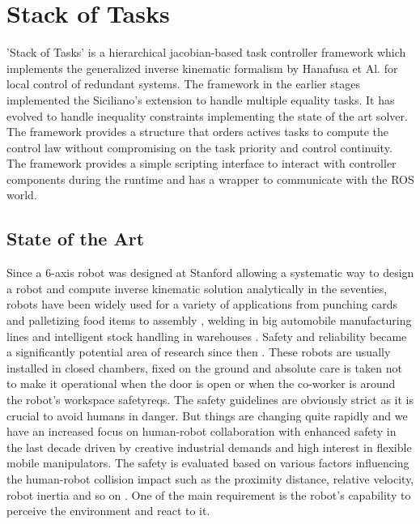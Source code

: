 \section{Stack of Tasks}

'Stack of Tasks' is a hierarchical jacobian-based task controller framework which implements the generalized inverse kinematic formalism by Hanafusa et Al. for local control of redundant systems\cite{hanafusa1981analysis}\cite{Mansard2009ik}. The framework in the earlier stages implemented the Siciliano's extension to handle multiple equality tasks\cite{siciliano1991general}. It has evolved to handle inequality constraints implementing the state of the art solver. The framework provides a structure that orders actives tasks to compute the control law without compromising on the task priority and control continuity. The framework provides a simple scripting interface to interact with controller components during the runtime and has a wrapper to communicate with the ROS world.
\subsection{State of the Art}
Since a 6-axis robot was designed at Stanford allowing a systematic way to design a robot and compute inverse kinematic solution analytically in the seventies, robots have been widely used for a variety of applications from punching cards and palletizing food items to assembly , welding in big automobile manufacturing lines and intelligent stock handling in warehouses \cite{scheinman1969design}. Safety and reliability became a significantly potential area of research since then \cite{dhillon2012robot}. These robots are usually installed in closed chambers, fixed on the ground and absolute care is taken not to make it operational when the door is open or when the co-worker is around the robot’s workspace {safetyreqs}. The safety guidelines are obviously strict as it is crucial to avoid humans in danger. But things are changing quite rapidly and we have an increased focus on human-robot collaboration with enhanced safety in the last decade \cite{Bicchi2008,dhillon2012robot} driven by creative industrial demands and high interest in flexible mobile manipulators. The safety is evaluated based on various factors influencing the human-robot collision impact such as the proximity distance, relative velocity, robot inertia and so on \cite{Kulic2006}. One of the main requirement is the robot’s capability to perceive the environment and react to it.



